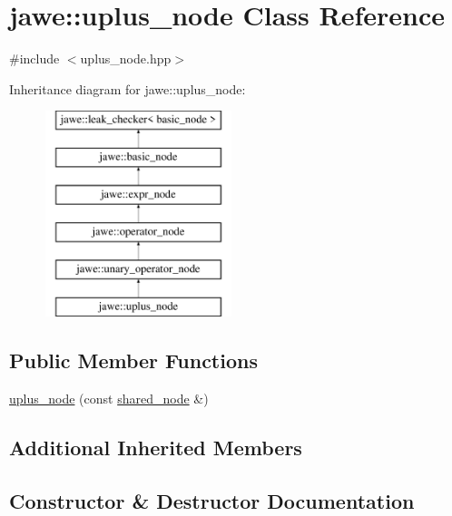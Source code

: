 \hypertarget{classjawe_1_1uplus__node}{}\section{jawe\+:\+:uplus\+\_\+node Class Reference}
\label{classjawe_1_1uplus__node}


{\ttfamily \#include $<$uplus\+\_\+node.\+hpp$>$}

Inheritance diagram for jawe\+:\+:uplus\+\_\+node\+:\begin{figure}[H]
\begin{center}
\leavevmode
\includegraphics[height=6.000000cm]{classjawe_1_1uplus__node}
\end{center}
\end{figure}
\subsection*{Public Member Functions}
\begin{DoxyCompactItemize}
\item 
\hyperlink{classjawe_1_1uplus__node_a46b2f35bd592e674d6dec64996cb031b}{uplus\+\_\+node} (const \hyperlink{namespacejawe_a3f307481d921b6cbb50cc8511fc2b544}{shared\+\_\+node} \&)
\end{DoxyCompactItemize}
\subsection*{Additional Inherited Members}


\subsection{Constructor \& Destructor Documentation}
\mbox{\label{classjawe_1_1uplus__node_a46b2f35bd592e674d6dec64996cb031b}} 
